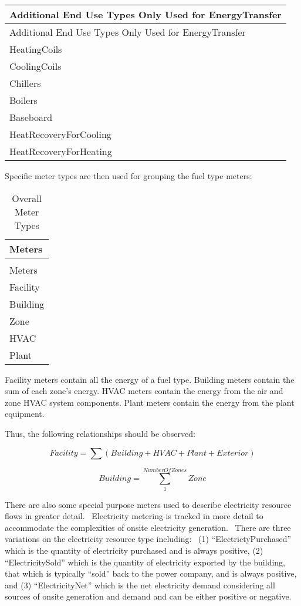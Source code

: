 \begin{longtable}[c]{@{}l@{}}
\toprule
Additional End Use Types Only Used for EnergyTransfer \tabularnewline
\midrule
\endfirsthead

\toprule
Additional End Use Types Only Used for EnergyTransfer \tabularnewline
\midrule
\endhead

HeatingCoils \tabularnewline
CoolingCoils \tabularnewline
Chillers \tabularnewline
Boilers \tabularnewline
Baseboard \tabularnewline
HeatRecoveryForCooling \tabularnewline
HeatRecoveryForHeating \tabularnewline
\bottomrule
\end{longtable}

Specific meter types are then used for grouping the fuel type meters:

\begin{longtable}[c]{@{}l@{}}
\caption{Overall Meter Types \label{table:overall-meter-types}} \tabularnewline
\toprule
Meters \tabularnewline
\midrule
\endfirsthead

\caption[]{Overall Meter Types} \tabularnewline
\toprule
Meters \tabularnewline
\midrule
\endhead

Facility \tabularnewline
Building \tabularnewline
Zone \tabularnewline
HVAC \tabularnewline
Plant \tabularnewline
\bottomrule
\end{longtable}

Facility meters contain all the energy of a fuel type. Building meters contain the sum of each zone's energy. HVAC meters contain the energy from the air and zone HVAC system components. Plant meters contain the energy from the plant equipment.

Thus, the following relationships should be observed:

\begin{equation}
Facility = \sum {\left( {Building + HVAC + Plant + Exterior} \right)}
\end{equation}

\begin{equation}
Building = \sum\limits_1^{NumberOfZones} {Zone}
\end{equation}

There are also some special purpose meters used to describe electricity resource flows in greater detail.~ Electricity metering is tracked in more detail to accommodate the complexities of onsite electricity generation.~ There are three variations on the electricity resource type including:~ (1) ``ElectrictyPurchased'' which is the quantity of electricity purchased and is always positive, (2) ``ElectricitySold'' which is the quantity of electricity exported by the building, that which is typically ``sold'' back to the power company, and is always positive, and (3) ``ElectricityNet'' which is the net electricity demand considering all sources of onsite generation and demand and can be either positive or negative.

